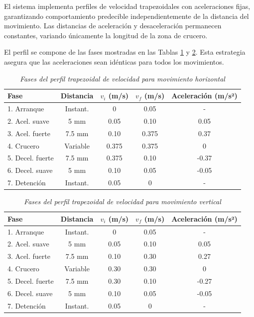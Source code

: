 El sistema implementa perfiles de velocidad trapezoidales con aceleraciones fijas, garantizando comportamiento predecible independientemente de la distancia del movimiento. Las distancias de aceleración y desaceleración permanecen constantes, variando únicamente la longitud de la zona de crucero.

El perfil se compone de las fases mostradas en las Tablas \ref{tab:perfil_horizontal} y \ref{tab:perfil_vertical}. Esta estrategia asegura que las aceleraciones sean idénticas para todos los movimientos.

\begin{table}[H]
\centering
\small
\begin{tabular}{|l|c|c|c|c|}
\hline
\textbf{Fase} & \textbf{Distancia} & \textbf{$v_i$ (m/s)} & \textbf{$v_f$ (m/s)} & \textbf{Aceleración (m/s²)} \\
\hline
1. Arranque & Instant. & 0 & 0.05 & - \\
\hline
2. Acel. suave & 5 mm & 0.05 & 0.10 & 0.05 \\
\hline
3. Acel. fuerte & 7.5 mm & 0.10 & 0.375 & 0.37 \\
\hline
4. Crucero & Variable & 0.375 & 0.375 & 0 \\
\hline
5. Decel. fuerte & 7.5 mm & 0.375 & 0.10 & -0.37 \\
\hline
6. Decel. suave & 5 mm & 0.10 & 0.05 & -0.05 \\
\hline
7. Detención & Instant. & 0.05 & 0 & - \\
\hline
\end{tabular}
\caption{\textit{Fases del perfil trapezoidal de velocidad para movimiento horizontal}}
\label{tab:perfil_horizontal}
\end{table}

\begin{table}[H]
\centering
\small
\begin{tabular}{|l|c|c|c|c|}
\hline
\textbf{Fase} & \textbf{Distancia} & \textbf{$v_i$ (m/s)} & \textbf{$v_f$ (m/s)} & \textbf{Aceleración (m/s²)} \\
\hline
1. Arranque & Instant. & 0 & 0.05 & - \\
\hline
2. Acel. suave & 5 mm & 0.05 & 0.10 & 0.05 \\
\hline
3. Acel. fuerte & 7.5 mm & 0.10 & 0.30 & 0.27 \\
\hline
4. Crucero & Variable & 0.30 & 0.30 & 0 \\
\hline
5. Decel. fuerte & 7.5 mm & 0.30 & 0.10 & -0.27 \\
\hline
6. Decel. suave & 5 mm & 0.10 & 0.05 & -0.05 \\
\hline
7. Detención & Instant. & 0.05 & 0 & - \\
\hline
\end{tabular}
\caption{\textit{Fases del perfil trapezoidal de velocidad para movimiento vertical}}
\label{tab:perfil_vertical}
\end{table}

